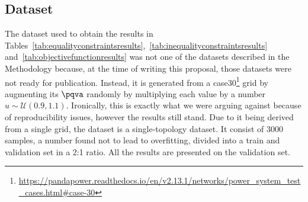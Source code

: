 \subsection*{Dataset}

The dataset used to obtain the results in
Tables~\ref{tab:equalityconstraintsresults},~\ref{tab:inequalityconstraintsresults} and~\ref{tab:objectivefunctionresults}
was not one of the datasets described in the Methodology because, at the time of writing this proposal, those datasets were not
ready for publication.
Instead, it is generated from a
case30\footnote{\url{https://pandapower.readthedocs.io/en/v2.13.1/networks/power_system_test_cases.html\#case-30}}
grid by augmenting its $\pqva$ randomly by multiplying each value by a number $u \sim \mathcal{U}(0.9, 1.1)$.
Ironically, this is exactly what we were arguing against because of reproducibility issues, however the
results still stand.
Due to it being derived from a single grid, the dataset is a single-topology dataset.
It consist of 3000 samples, a number found not to lead to overfitting, divided into a train and validation
set in a 2:1 ratio.
All the results are presented on the validation set.